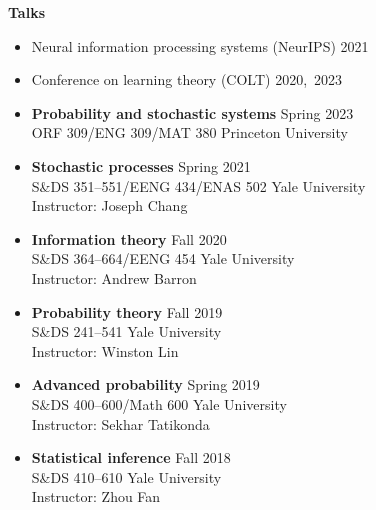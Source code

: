 \documentclass[letterpaper,11pt,oneside]{article}
\theoremstyle{definition}
\begin{document}
%	
	\noindent \textbf{Talks}
	\begin{itemize}
		\item[] Neural information processing systems (NeurIPS) \hfill 2021
		\item[] Conference on learning theory (COLT) \hfill 2020,\ 2023
	\end{itemize}

	
	\begin{itemize}
		\item[] {\bf Probability and stochastic systems} \hfill Spring 2023\\
		ORF 309/ENG 309/MAT 380 \hfill Princeton University\\
	\end{itemize}
		
	\begin{itemize}
		\item[] {\bf Stochastic processes} \hfill Spring 2021\\
		S\&DS 351--551/EENG 434/ENAS 502 \hfill Yale University\\
		Instructor: Joseph Chang
		
		\item[] {\bf Information theory} \hfill Fall 2020\\
		S\&DS 364--664/EENG 454 \hfill Yale University\\
		Instructor: Andrew Barron
		\item[] {\bf Probability theory} \hfill Fall 2019\\
		 S\&DS 241--541  \hfill Yale University\\
		 Instructor: Winston Lin
		\item[] {\bf Advanced probability} \hfill Spring 2019\\
		S\&DS 400--600/Math 600  \hfill Yale University\\
		Instructor: Sekhar Tatikonda
		\item[] {\bf Statistical inference} \hfill Fall 2018\\
		 S\&DS 410--610  \hfill Yale University\\
		 Instructor: Zhou Fan
		 
	\end{itemize}	
\end{document}
